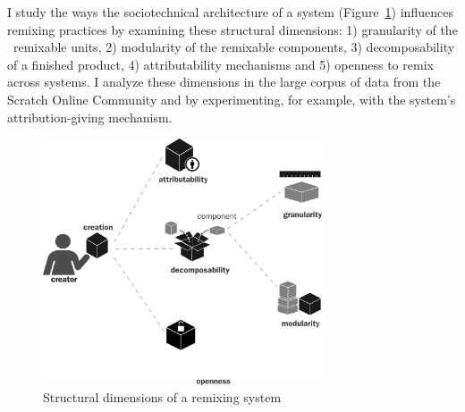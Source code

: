 I study the ways the sociotechnical architecture of a system (Figure~\ref{fig:structure}) influences remixing practices by examining these structural dimensions:
1) granularity of the \ remixable units, 
2) modularity of the remixable components, 
3) decomposability of a finished product, 
4) attributability mechanisms and 
5) openness to remix across systems. 
I analyze these dimensions in the large corpus of data from the Scratch Online Community and by experimenting, for example, with the system's attribution-giving mechanism.

\begin{figure}
\centering
\includegraphics[width=3.25in]{figures/structure.pdf}
\caption{Structural dimensions of a remixing system}
\label{fig:structure}
\end{figure}

